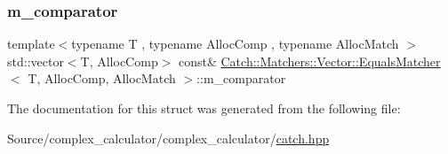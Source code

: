 \subsubsection{\texorpdfstring{m\+\_\+comparator}{m\_comparator}}
{\footnotesize\ttfamily template$<$typename T , typename Alloc\+Comp , typename Alloc\+Match $>$ \\
std\+::vector$<$T, Alloc\+Comp$>$ const\& \mbox{\hyperlink{struct_catch_1_1_matchers_1_1_vector_1_1_equals_matcher}{Catch\+::\+Matchers\+::\+Vector\+::\+Equals\+Matcher}}$<$ T, Alloc\+Comp, Alloc\+Match $>$\+::m\+\_\+comparator}



The documentation for this struct was generated from the following file\+:\begin{DoxyCompactItemize}
\item 
Source/complex\+\_\+calculator/complex\+\_\+calculator/\mbox{\hyperlink{catch_8hpp}{catch.\+hpp}}\end{DoxyCompactItemize}
